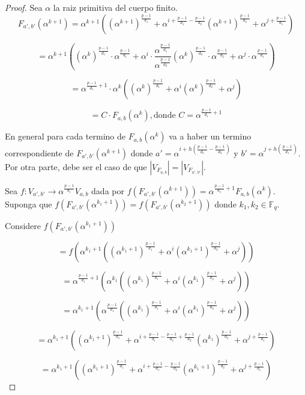 \documentclass{article}
\theoremstyle{definition}
\theoremstyle{remark}
\numberwithin{equation}{section}
\begin{document}
\begin{proof}
  
  Sea $\alpha$ la raiz primitiva del cuerpo finito. $$F_{a', b'}(\alpha^{k+1}) = \alpha^{k+1}((\alpha^{k+1})^{\frac{p-1}{d_1}} + \alpha^{i + \frac{p-1}{d_1} - \frac{p-1}{d_2}}(\alpha^{k+1})^{\frac{p-1}{d_2}} + \alpha^{j + \frac{p-1}{d_1}})$$

  $$= \alpha^{k+1}((\alpha^{k})^{\frac{p-1}{d_1}} \cdot \alpha^{\frac{p-1}{d_1}} + \alpha^{i} \cdot \frac{\alpha^{\frac{p-1}{d_1}}} {\alpha^{\frac{p-1}{d_2}}} (\alpha^{k})^{\frac{p-1}{d_2}} \cdot \alpha^{\frac{p-1}{d_2}} + \alpha^{j} \cdot \alpha^{\frac{p-1}{d_1}})$$

  $$= \alpha^{\frac{p-1}{d_1} + 1} \cdot \alpha^{k}((\alpha^{k})^{\frac{p-1}{d_1}} + \alpha^{i}(\alpha^{k})^{\frac{p-1}{d_2}} + \alpha^{j} )$$

  $$= C \cdot F_{a,b}(\alpha^k), \mbox{donde } C = \alpha^{\frac{p-1}{d_1} + 1}$$

  En general para cada termino de $F_{a,b}(\alpha^{k})$ va a haber un termino correspondiente de $F_{a',b'}(\alpha^{k+1})$ donde $a' = \alpha^{i + h(\frac{p-1}{d_1} - \frac{p-1}{d_2})}$ y $b'= \alpha^{j + h(\frac{p-1}{d_1})}$. Por otra parte, debe ser el caso de que $\left\vert V_{F_{a,b}} \right\vert = \left\vert V_{F_{a',b'}} \right\vert$.

  Sea $f:V_{a', b'} \rightarrow \alpha^{\frac{p-1}{d_1}}V_{a, b}$ dada por $f(F_{a', b'}(\alpha^{k+1})) = \alpha^{\frac{p-1}{d_1}+1}F_{a, b}(\alpha^k)$.
  Suponga que $f(F_{a', b'}(\alpha^{k_1+1})) = f(F_{a', b'}(\alpha^{k_2+1}))$ donde $k_1, k_2 \in \mathbb{F}_q$. 

  Considere $f(F_{a', b'}(\alpha^{k_1+1}))$

  $$= f(\alpha^{k_1+1}((\alpha^{k_1+1})^{\frac{p-1}{d_1}} + \alpha^{i}(\alpha^{k_1+1})^{\frac{p-1}{d_2}} + \alpha^{j}))$$ 

  $$= \alpha^{\frac{p-1}{d_1}+1}(\alpha^{k_1}((\alpha^{k_1})^{\frac{p-1}{d_1}} + \alpha^{i}(\alpha^{k_1})^{\frac{p-1}{d_2}} + \alpha^{j}))$$ 

  $$= \alpha^{k_1+1}(\alpha^{\frac{p-1}{d_1}}((\alpha^{k_1})^{\frac{p-1}{d_1}} + \alpha^{i}(\alpha^{k_1})^{\frac{p-1}{d_2}} + \alpha^{j}))$$ 

  $$= \alpha^{k_1+1}((\alpha^{k_1+1})^{\frac{p-1}{d_1}} + \alpha^{i + \frac{p-1}{d_1} - \frac{p-1}{d_2} + \frac{p-1}{d_2}}(\alpha^{k_1})^{\frac{p-1}{d_2}} + \alpha^{j + \frac{p-1}{d_1}})$$

  $$= \alpha^{k_1+1}((\alpha^{k_1+1})^{\frac{p-1}{d_1}} + \alpha^{i + \frac{p-1}{d_1} - \frac{p-1}{d_2}}(\alpha^{k_1+1})^{\frac{p-1}{d_2}} + \alpha^{j + \frac{p-1}{d_1}})$$ 


\end{proof}
\end{document}
